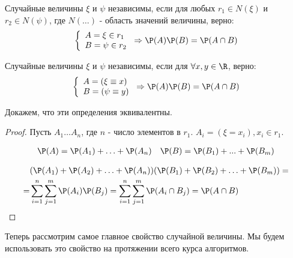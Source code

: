 \begin{definition}
    Случайные величины $\xi$ и $\psi$ независимы, если для любых $r_1 \in N(\xi)$ и $r_2 \in N(\psi)$, где $N(\ldots)$ - область значений величины, верно:
    \[
        \left \lbrace
        \begin{array}{l}
            A = \xi \in r_1\\
            B = \psi \in r_2
        \end{array}
        \right.
        \Rightarrow \P(A)\P(B) = \P(A \cap B)
    \]
\end{definition}

\begin{definition}
    Случайные величины $\xi$ и $\psi$ независимы, если для $\forall x,y \in \R$, верно:
    \[
        \left \lbrace
        \begin{array}{l}
            A = (\xi \equiv x) \\
            B = (\psi \equiv y)
        \end{array}
        \right.
        \Rightarrow \P(A)\P(B) = \P(A \cap B)
    \]
\end{definition}

Докажем, что эти определения эквивалентны.


\begin{proof}
    Пусть $A_1 \ldots A_n$, где $n$ - число элементов в $r_1$. $A_i = (\xi = x_i), x_i \in r_1$. \par
    \begin{align*}
        & \P(A) = \P(A_1)+ \ldots +\P(A_n)
        & \P(B) = \P(B_1)+...+\P(B_m)
    \end{align*}

    \begin{align}
          & (\P(A_1) + \P(A_2) + \ldots + \P(A_n))(\P(B_1) + \P(B_2) + \ldots + \P(B_m)) = \\
        = & \sum_{i=1}^{n}\sum_{j=1}^{m}\P(A_i)\P(B_j) = \sum_{i=1}^{n}\sum_{j=1}^{m}\P(A_i \cap B_j) = \P(A \cap B)
    \end{align}
\end{proof}

Теперь рассмотрим самое главное свойство случайной величины. Мы будем использовать это свойство на протяжении всего курса алгоритмов. \par

